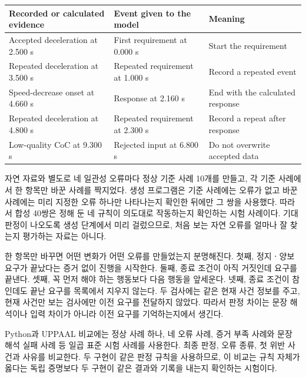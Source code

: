 \begin{table}[t]
\centering
{}
\label{tab:scene1-map}
\scriptsize
\begin{tabularx}{\columnwidth}{L{0.34\columnwidth}L{0.25\columnwidth}Y}
\toprule
Recorded or calculated evidence & Event given to the model & Meaning \\
\midrule
Accepted deceleration at 2.500 s & First requirement at 0.000 s & Start the requirement \\
Repeated deceleration at 3.500 s & Repeated requirement at 1.000 s & Record a repeated event \\
Speed-decrease onset at 4.660 s & Response at 2.160 s & End with the calculated response \\
Repeated deceleration at 4.800 s & Repeated requirement at 2.300 s & Record a repeat after response \\
Low-quality CoC at 9.300 s & Rejected input at 6.800 s & Do not overwrite accepted data \\
\bottomrule
\end{tabularx}
\end{table}

자연 자료와 별도로 네 일관성 오류마다 정상 기준 사례 10개를 만들고, 각 기준 사례에서 한 항목만 바꾼 사례를 짝지었다. 생성 프로그램은 기준 사례에는 오류가 없고 바꾼 사례에는 미리 지정한 오류 하나만 나타나는지 확인한 뒤에만 그 쌍을 사용했다. 따라서 합성 40쌍은 정해 둔 네 규칙이 의도대로 작동하는지 확인하는 시험 사례이다. 기대 판정이 나오도록 생성 단계에서 미리 걸렀으므로, 처음 보는 자연 오류를 얼마나 잘 찾는지 평가하는 자료는 아니다.

한 항목만 바꾸면 어떤 변화가 어떤 오류를 만들었는지 분명해진다. 첫째, 정지ㆍ양보 요구가 끝났다는 증거 없이 진행을 시작한다. 둘째, 종료 조건이 아직 거짓인데 요구를 끝낸다. 셋째, 꼭 먼저 해야 하는 행동보다 다음 행동을 앞세운다. 넷째, 종료 조건이 참인데도 끝난 요구를 목록에서 지우지 않는다. 두 검사에는 같은 현재 사건 정보를 주고, 현재 사건만 보는 검사에만 이전 요구를 전달하지 않았다. 따라서 판정 차이는 문장 해석이나 입력 차이가 아니라 이전 요구를 기억하는지에서 생긴다.

Python과 UPPAAL 비교에는 정상 사례 하나, 네 오류 사례, 증거 부족 사례와 문장 해석 실패 사례 등 일곱 표준 시험 사례를 사용한다. 최종 판정, 오류 종류, 첫 위반 사건과 {\unknown} 사유를 비교한다. 두 구현이 같은 판정 규칙을 사용하므로, 이 비교는 규칙 자체가 옳다는 독립 증명보다 두 구현이 같은 결과와 기록을 내는지 확인하는 시험이다.

